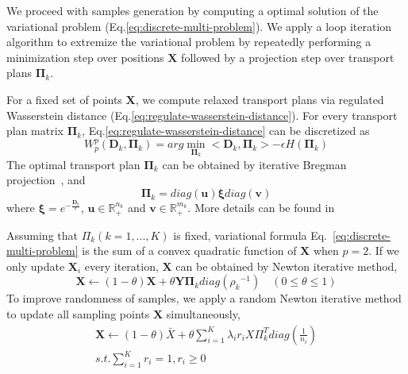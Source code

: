  We proceed with samples generation by computing a optimal solution of the variational problem (Eq.\ref{eq:discrete-multi-problem}).
 We apply a loop iteration algorithm to extremize the variational problem by repeatedly performing a minimization step over positions $\mathbf{X}$ followed by a projection step over transport plans $\mathbf{\Pi}_k$.

 For a fixed set of points $\mathbf X$,
 we compute  relaxed transport plans via regulated Wasserstein distance (Eq.\ref{eq:regulate-wasserstein-distance}).
 For every transport plan matrix $\mathbf{\Pi}_k$,
 Eq.\ref{eq:regulate-wasserstein-distance} can be discretized as
 \begin{equation}\label{eq:discrete-regulate-wasserstein-barycenter}
   W_p^p(\mathbf{D}_k,\mathbf{\Pi}_k)=arg\min\limits_{\mathbf{\Pi}_k}<\mathbf{D}_k,\mathbf{\Pi}_k>-\epsilon H(\mathbf{\Pi}_k)
 \end{equation}
The optimal transport plan $\mathbf{\Pi}_k$ can be obtained by iterative Bregman projection~\cite{cuturi:2013:sinkhorn,benamou:2015:iterative}, and
\begin{equation}\label{eq:transport-plan}
  \mathbf{\Pi}_k=diag(\mathbf{u})\mathbf{\xi}diag(\mathbf{v})
\end{equation}
where $\mathbf{\xi}=e^{-\frac{\mathbf{D}_k}{\epsilon}}$,
$\mathbf{u}\in \mathbb{R}_+^{n_k}$ and $\mathbf{v}\in\mathbb{R}_+^{m_k}$.
More details can be found in~\cite{cuturi:2013:sinkhorn,cuturi:2013:fast,benamou:2015:iterative}



Assuming that $\Pi_k(k=1,...,K)$ is fixed,
variational formula Eq.~\ref{eq:discrete-multi-problem}
is the sum of a convex quadratic function of $\mathbf{X}$ when $p=2$.
If we only update $\mathbf{X}_i$ every iteration,
$\mathbf{X}$ can be obtained by Newton iterative method,
\begin{equation}\label{eq:position-iterative}
  \mathbf{X}\leftarrow(1-\theta)\mathbf{X}+\theta\mathbf{Y}\mathbf{\Pi}_kdiag({\rho_k}^{-1}) \quad (0\leq\theta\leq 1)
\end{equation}
To improve randomness of samples,
we apply a random Newton iterative method to update all sampling points $\mathbf{X}$ simultaneously,
\begin{equation}
\begin{split}
\mathbf{X}\leftarrow(1-\theta)\bar X+\theta\sum_{i=1}^K\lambda_ir_iX\Pi_k^Tdiag(\frac{1}{n_i})\\
 s.t. \sum\limits_{i=1}^{K}r_i=1, r_i\geq 0
 \end{split}
\end{equation}

